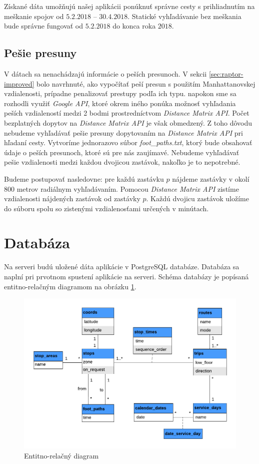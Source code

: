 Získané dáta umožňujú našej aplikácii ponúknuť správne cesty s prihliadnutím na meškanie spojov od $5.2.2018$ – $30.4.2018$. Statické vyhľadávanie bez meškania bude správne fungovať od $5.2.2018$ do konca roka $2018$.


\subsection{Pešie presuny}
V dátach sa nenachádzajú informácie o peších presunoch. V sekcii \ref{sec:raptor-improved} bolo navrhnuté, ako vypočítať peší presun s použitím Manhattanovskej vzdialenosti, prípadne penalizovať prestupy podľa ich typu. napokon sme sa rozhodli využiť   \textit{Google API}, ktoré okrem iného ponúka možnosť vyhľadania peších vzdialeností medzi 2 bodmi prostredníctvom \textit{Distance Matrix API}. Počet bezplatných dopytov na \textit{Distance Matrix API} je však obmedzený. Z toho dôvodu nebudeme vyhľadávať pešie presuny dopytovaním na \textit{Distance Matrix API} pri hľadaní cesty. Vytvoríme jednorazovo súbor \textit{foot\_paths.txt}, ktorý bude obsahovať údaje o peších presunoch, ktoré sú pre nás zaujímavé. Nebudeme vyhľadávať pešie vzdialenosti medzi každou dvojicou zastávok, nakoľko je to nepotrebné. 

Budeme postupovať nasledovne: pre každú zastávku $p$ nájdeme zastávky v okolí 800 metrov radiálnym vyhľadávaním. Pomocou \textit{Distance Matrix API} zistíme vzdialenosti nájdených zastávok od zastávky $p$. Každú dvojicu zastávok uložíme do súboru spolu so zistenými vzdialenosťami určených v minútach.

\section{Databáza}

Na serveri budú uložené dáta aplikácie v PostgreSQL databáze. Databáza sa naplní pri prvotnom spustení aplikácie na serveri. Schéma databázy je popísaná entitno-relačným diagramom na obrázku \ref{fig:erd}.

\begin{figure}[H]
\centerline{\includegraphics[width=1.0\textwidth]{images/ERD}}
\caption[Entitno-relačný diagram]{Entitno-relačný diagram}
\label{fig:erd}
\end{figure}

